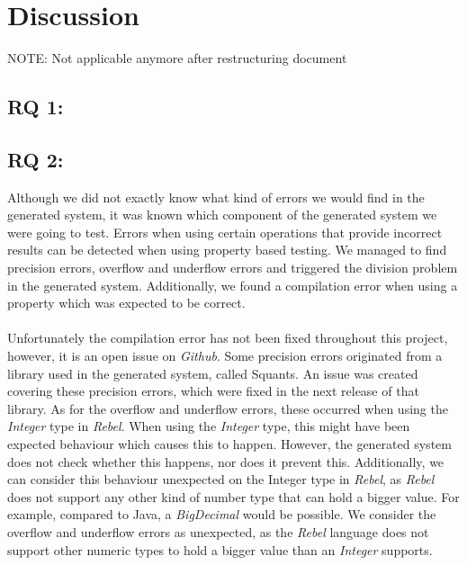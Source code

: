 \chapter{Discussion}
\label{cpt:7_discussion}
NOTE: Not applicable anymore after restructuring document
\section{RQ 1: \rqOne}

\section{RQ 2: \rqTwo}
Although we did not exactly know what kind of errors we would find in the generated system, it was
known which component of the generated system we were going to test. Errors when using certain operations that provide incorrect results can be detected when using property based testing. We managed to find precision errors, overflow and underflow errors and triggered the division problem in the generated system. Additionally, we found a compilation error when using a property which was expected to be correct.\\
\\
Unfortunately the compilation error has not been fixed throughout this project, however, it is an open issue on \textit{Github}. Some precision errors originated from a library used in the generated system, called Squants. An issue was created covering these precision errors, which were fixed in the next release of that library. As for the overflow and underflow errors, these occurred when using the \textit{Integer} type in \textit{Rebel}. When using the \textit{Integer} type, this might have been expected behaviour which causes this to happen. However, the generated system does not check whether this happens, nor does it prevent this. Additionally, we can consider this behaviour unexpected on the Integer type in
\textit{Rebel}, as \textit{Rebel} does not support any other kind of number type that can hold a bigger value. For example, compared to
Java, a \textit{BigDecimal} would be possible. We consider the overflow and underflow errors as unexpected, as the \textit{Rebel} language does not support other numeric types to hold a bigger value than an \textit{Integer} supports.

